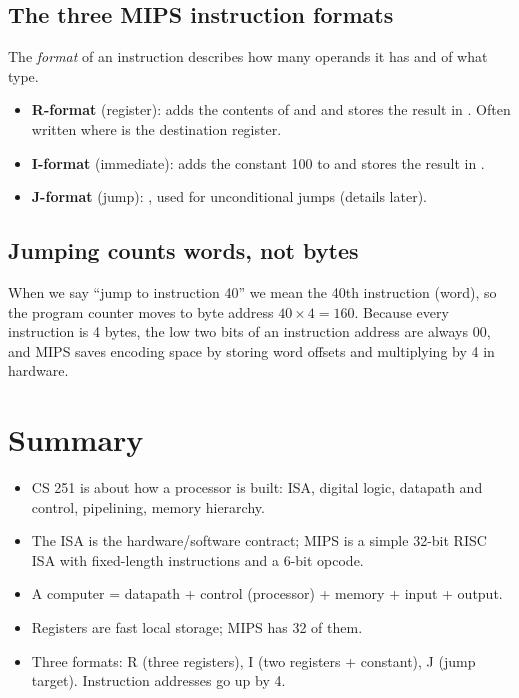 \subsection{The three MIPS instruction formats}

The \emph{format} of an instruction describes how many operands it has and
of what type.
\begin{itemize}
  \item \textbf{R-format} (register):  adds the
    contents of  and  and stores the result in
    . Often written  where  is the
    destination register.
  \item \textbf{I-format} (immediate):  adds the
    constant 100 to  and stores the result in .
  \item \textbf{J-format} (jump): , used for unconditional
    jumps (details later).
\end{itemize}

\subsection{Jumping counts words, not bytes}

When we say ``jump to instruction 40'' we mean the 40th instruction (word),
so the program counter moves to byte address $40 \times 4 = 160$. Because
every instruction is 4 bytes, the low two bits of an instruction address are
always $00$, and MIPS saves encoding space by storing word offsets and
multiplying by 4 in hardware.

\section*{Summary}
\begin{itemize}
  \item CS 251 is about how a processor is built: ISA, digital logic,
    datapath and control, pipelining, memory hierarchy.
  \item The ISA is the hardware/software contract; MIPS is a simple 32-bit
    RISC ISA with fixed-length instructions and a 6-bit opcode.
  \item A computer = datapath + control (processor) + memory + input + output.
  \item Registers are fast local storage; MIPS has 32 of them.
  \item Three formats: R (three registers), I (two registers + constant),
    J (jump target). Instruction addresses go up by 4.
\end{itemize}
